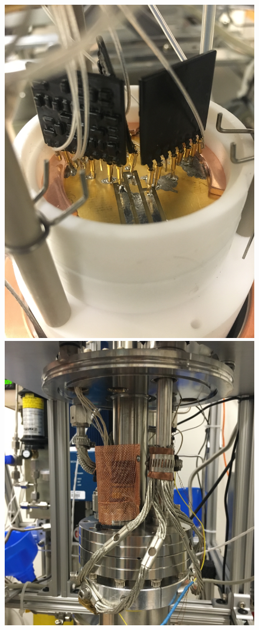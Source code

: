  \begin{figure}[htbp]
\begin{center}
\includegraphics[width=\halffig]{figures/testbed/chargeamp_mount1.jpg}
\includegraphics[width=\halffig]{figures/testbed/chargeamp_mount2.jpg}

\end{center}
\end{figure}
